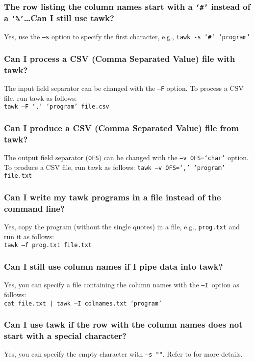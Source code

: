 \documentclass[documentation]{subfiles}
\begin{document}
\subsubsection{The row listing the column names start with a {\tt `\#'} instead of a {\tt `\%'}\ldots Can I still use tawk?}
Yes, use the {\tt --s} option to specify the first character, e.g., {\tt tawk -s `\#' `program'}

\subsubsection{Can I process a CSV (Comma Separated Value) file with tawk?}
The input field separator can be changed with the {\tt --F} option.
To process a CSV file, run tawk as follows:\\
{\tt tawk --F `,' `program' file.csv}

\subsubsection{Can I produce a CSV (Comma Separated Value) file from tawk?}
The output field separator ({\tt OFS}) can be changed with the {\tt --v OFS=`char'} option.
To produce a CSV file, run tawk as follows: {\tt tawk --v OFS=`,' `program' file.txt}

\subsubsection{Can I write my tawk programs in a file instead of the command line?}
Yes, copy the program (without the single quotes) in a file, e.g., {\tt prog.txt} and run it as follows:\\
{\tt tawk --f prog.txt file.txt}

\subsubsection{Can I still use column names if I pipe data into tawk?}
Yes, you can specify a file containing the column names with the {\tt --I} option as follows:\\
{\tt cat file.txt | tawk --I colnames.txt `program'}

\subsubsection{Can I use tawk if the row with the column names does not start with a special character?}
Yes, you can specify the empty character with {\tt --s ""}.
Refer to  for more details.
\end{document}
